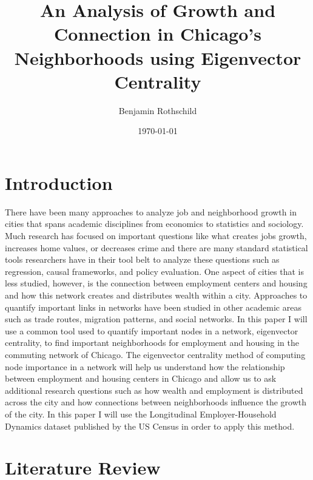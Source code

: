 \documentclass{article}
\title{An Analysis of Growth and Connection in Chicago’s Neighborhoods using Eigenvector Centrality}
\author{Benjamin Rothschild}
\date{\today}
\theoremstyle{definition}
\theoremstyle{remark}
\begin{document}
\begin{titlepage}
\maketitle
\thispagestyle{empty}

\end{titlepage}

\section{Introduction}
 
There have been many approaches to analyze job and neighborhood growth in cities that spans academic disciplines from economics to statistics and sociology.  Much research has focused on important questions like what creates jobs growth, increases home values, or decreases crime and there are many standard statistical tools researchers have in their tool belt to analyze these questions such as regression, causal frameworks, and policy evaluation.  One aspect of cities that is less studied, however, is the connection between employment centers and housing and how this network creates and distributes wealth within a city.  Approaches to quantify important links in networks have been studied in other academic areas such as trade routes, migration patterns, and social networks.  In this paper I will use a common tool used to quantify important nodes in a network, eigenvector centrality, to find important neighborhoods for employment and housing in the commuting network of Chicago.  The eigenvector centrality method of computing node importance in a network will help us understand how the relationship between employment and housing centers in Chicago and allow us to ask additional research questions such as how wealth and employment is distributed across the city and how connections between neighborhoods influence the growth of the city.  In this paper I will use the Longitudinal Employer-Household Dynamics dataset published by the US Census in order to apply this method.

\section{Literature Review}
\end{document}
